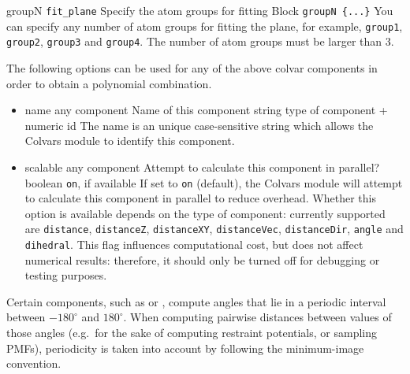 \begin{cvcoptions}
	\item %
	\key
	{groupN}{%
		\texttt{fit\_plane}}{%
		Specify the atom groups for fitting}{%
		Block \texttt{groupN \{...\}}
		}{%
		You can specify any number of atom groups for fitting the plane, for 
		example, \texttt{group1}, \texttt{group2}, \texttt{group3} and 
		\texttt{group4}. The number of atom groups must be larger than 3.
	}
\end{cvcoptions}



The following options can be used for any of the above colvar components in order to obtain a polynomial combination\ifdefined{}\fi.
\begin{itemize}
\item %
  \keydef
    {name}{%
    any component}{%
    Name of this component}{%
    string}{%
    type of component + numeric id}{%
    The name is an unique case-sensitive string which allows the
    Colvars module to identify this component. 
    \ifdefined{}\fi
    }

\item %
  \keydef
    {scalable}{%
    any component}{%
    Attempt to calculate this component in parallel?}{%
    boolean}{%
    \texttt{on}, if available}{%
    If set to \texttt{on} (default), the Colvars module will attempt to calculate this component in parallel to reduce overhead.
    Whether this option is available depends on the type of component: currently supported are \texttt{distance}, \texttt{distanceZ}, \texttt{distanceXY}, \texttt{distanceVec}, \texttt{distanceDir}, \texttt{angle} and \texttt{dihedral}.
    This flag influences computational cost, but does not affect numerical results: therefore, it should only be turned off for debugging or testing purposes.
  }
\end{itemize}



Certain components, such as  or
, compute angles that lie in a periodic interval between
$-180^\circ$ and $180^\circ$.  When computing pairwise distances between values of those angles
(e.g.\ for the sake of computing restraint potentials, or sampling PMFs), periodicity is taken into
account by following the minimum-image convention.

